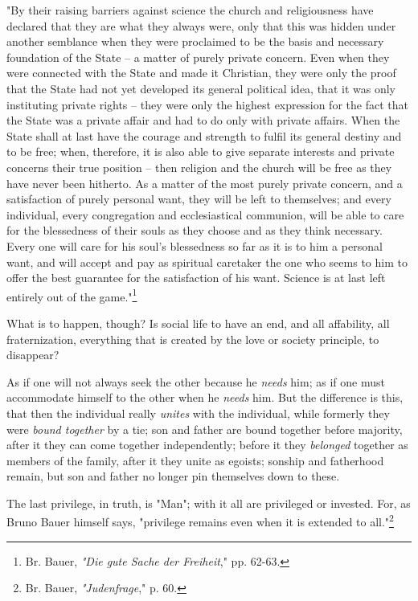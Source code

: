 "{}By their raising barriers against science the church and religiousness have 
declared that they are what they always were, only that this was hidden under 
another semblance when they were proclaimed to be the basis and necessary 
foundation of the State -- a matter of purely private concern. Even when they 
were connected with the State and made it Christian, they were only the proof 
that the State had not yet developed its general political idea, that it was 
only instituting private rights -- they were only the highest expression for 
the fact that the State was a private affair and had to do only with private 
affairs. When the State shall at last have the courage and strength to fulfil 
its general destiny and to be free; when, therefore, it is also able to give 
separate interests and private concerns their true position -- then religion 
and the church will be free as they have never been hitherto. As a matter of 
the most purely private concern, and a satisfaction of purely personal want, 
they will be left to themselves; and every individual, every congregation and 
ecclesiastical communion, will be able to care for the blessedness of their 
souls as they choose and as they think necessary. Every one will care for his 
soul's blessedness so far as it is to him a personal want, and will accept and 
pay as spiritual caretaker the one who seems to him to offer the best 
guarantee for the satisfaction of his want. Science is at last left entirely 
out of the game."{}\footnote{Br. Bauer, \textit{"{}Die gute Sache der 
Freiheit},"{} pp. 62-63.}

What is to happen, though? Is social life to have an end, and all affability, 
all fraternization, everything that is created by the love or society 
principle, to disappear?

As if one will not always seek the other because he \textit{needs} him; as if 
one must accommodate himself to the other when he \textit{needs} him. But the 
difference is this, that then the individual really \textit{unites} with the 
individual, while formerly they were \textit{bound together} by a tie; son and 
father are bound together before majority, after it they can come together 
independently; before it they \textit{belonged} together as members of the 
family, after it they unite as egoists; sonship and fatherhood remain, but son 
and father no longer pin themselves down to these.

The last privilege, in truth, is "{}Man"{}; with it all are privileged or 
invested. For, as Bruno Bauer himself says, "{}privilege remains even when it 
is extended to all."{}\footnote{Br. Bauer, \textit{"{}Judenfrage},"{} p. 60.}

